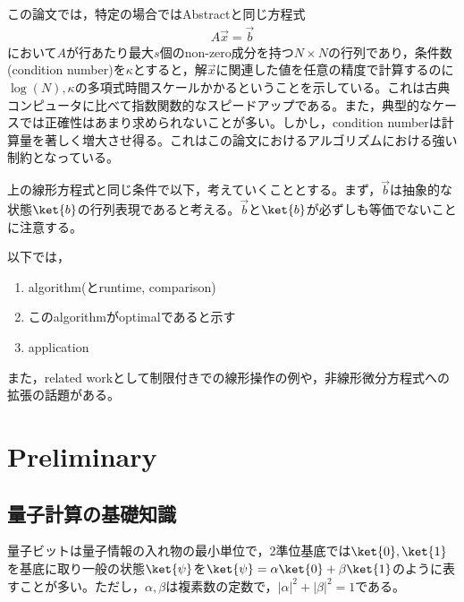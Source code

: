 \documentclass[b5paper,papersize,dvipdfmx,fleqn]{jsarticle}
\begin{document}

この論文では，特定の場合ではAbstractと同じ方程式
\begin{eqnarray}
  A\vec{x} = \vec{b}
\end{eqnarray}
において$A$が行あたり最大$s$個のnon-zero成分を持つ$N\times N$の行列であり，条件数(condition number)を$\kappa $とすると，解$\vec{x}$に関連した値を任意の精度で計算するのに$\log(N),\kappa $の多項式時間スケールかかるということを示している。これは古典コンピュータに比べて指数関数的なスピードアップである。また，典型的なケースでは正確性はあまり求められないことが多い。しかし，condition numberは計算量を著しく増大させ得る。これはこの論文におけるアルゴリズムにおける強い制約となっている。

上の線形方程式と同じ条件で以下，考えていくこととする。まず，$\vec{b}$は抽象的な状態$\ket{b}$の行列表現であると考える。$\vec{b}$と$\ket{b}$が必ずしも等価でないことに注意する。


以下では，
\begin{enumerate}
  \item algorithm(とruntime, comparison)
  \item このalgorithmがoptimalであると示す
  \item application
\end{enumerate}


また，related workとして制限付きでの線形操作の例や，非線形微分方程式への拡張の話題がある。

\section{Preliminary}
\subsection{量子計算の基礎知識}
量子ビットは量子情報の入れ物の最小単位で，2準位基底では$\ket{0}, \ket{1}$を基底に取り一般の状態$\ket{\psi }$を$\ket{\psi }= \alpha \ket{0}+\beta \ket{1}$のように表すことが多い。ただし，$\alpha, \beta$は複素数の定数で，$|\alpha|^2 + |\beta|^2 = 1$である。
\end{document}
